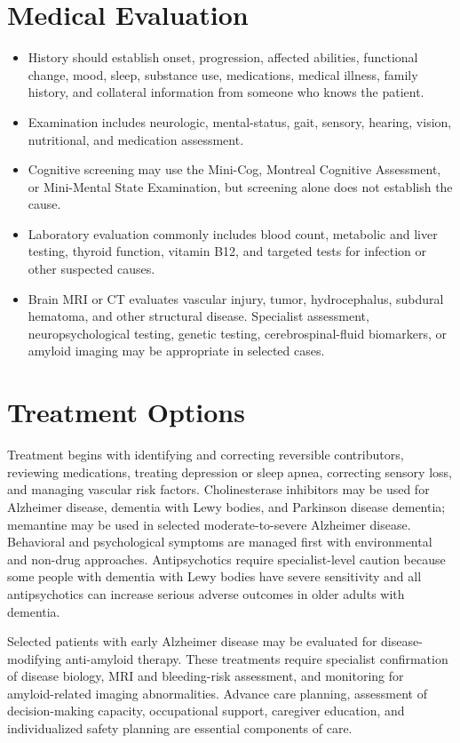 \section*{Medical Evaluation}
\begin{itemize}
  \item History should establish onset, progression, affected abilities, functional change, mood, sleep, substance use, medications, medical illness, family history, and collateral information from someone who knows the patient.
  \item Examination includes neurologic, mental-status, gait, sensory, hearing, vision, nutritional, and medication assessment.
  \item Cognitive screening may use the Mini-Cog, Montreal Cognitive Assessment, or Mini-Mental State Examination, but screening alone does not establish the cause.
  \item Laboratory evaluation commonly includes blood count, metabolic and liver testing, thyroid function, vitamin B12, and targeted tests for infection or other suspected causes.
  \item Brain MRI or CT evaluates vascular injury, tumor, hydrocephalus, subdural hematoma, and other structural disease. Specialist assessment, neuropsychological testing, genetic testing, cerebrospinal-fluid biomarkers, or amyloid imaging may be appropriate in selected cases.
\end{itemize}

\section*{Treatment Options}
Treatment begins with identifying and correcting reversible contributors, reviewing medications, treating depression or sleep apnea, correcting sensory loss, and managing vascular risk factors. Cholinesterase inhibitors may be used for Alzheimer disease, dementia with Lewy bodies, and Parkinson disease dementia; memantine may be used in selected moderate-to-severe Alzheimer disease. Behavioral and psychological symptoms are managed first with environmental and non-drug approaches. Antipsychotics require specialist-level caution because some people with dementia with Lewy bodies have severe sensitivity and all antipsychotics can increase serious adverse outcomes in older adults with dementia.

Selected patients with early Alzheimer disease may be evaluated for disease-modifying anti-amyloid therapy. These treatments require specialist confirmation of disease biology, MRI and bleeding-risk assessment, and monitoring for amyloid-related imaging abnormalities. Advance care planning, assessment of decision-making capacity, occupational support, caregiver education, and individualized safety planning are essential components of care.

